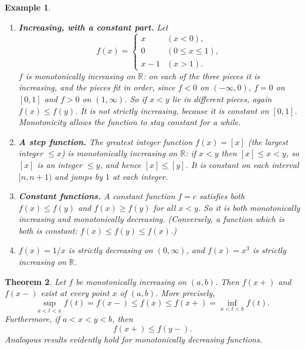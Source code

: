 \documentclass{article}
\theoremstyle{mythm}
\newtheorem{theorem}{Theorem}[section]
\newtheorem{example}[theorem]{Example}
\begin{document}
\begin{example}\label{ex:monotone}
\begin{enumerate}
    \item \textbf{Increasing, with a constant part.} Let
    \[
    f(x) = \begin{cases} x & (x < 0), \\ 0 & (0 \leq x \leq 1), \\ x - 1 & (x > 1). \end{cases}
    \]
    $f$ is monotonically increasing on $\mathbb{R}$: on each of the three pieces it is increasing, and the pieces fit in order, since $f < 0$ on $(-\infty,0)$, $f = 0$ on $[0,1]$ and $f > 0$ on $(1,\infty)$. So if $x < y$ lie in different pieces, again $f(x) \leq f(y)$. It is not strictly increasing, because it is constant on $[0,1]$. Monotonicity allows the function to stay constant for a while.
    \item \textbf{A step function.} The greatest integer function $f(x) = [x]$ (the largest integer $\leq x$) is monotonically increasing on $\mathbb{R}$: if $x < y$ then $[x] \leq x < y$, so $[x]$ is an integer $\leq y$, and hence $[x] \leq [y]$. It is constant on each interval $[n, n+1)$ and jumps by $1$ at each integer.
    \item \textbf{Constant functions.} A constant function $f = c$ satisfies both $f(x) \leq f(y)$ and $f(x) \geq f(y)$ for all $x < y$. So it is \textit{both} monotonically increasing and monotonically decreasing. (Conversely, a function which is both is constant: $f(x) \leq f(y) \leq f(x)$.)
    \item $f(x) = 1/x$ is strictly decreasing on $(0, \infty)$, and $f(x) = x^3$ is strictly increasing on $\mathbb{R}$.
\end{enumerate}
\end{example}

\begin{theorem}\label{thm:monotonelimits}
Let $f$ be monotonically increasing on $(a,b)$. Then $f(x+)$ and $f(x-)$ exist at every point $x$ of $(a,b)$. More precisely,
\[
\sup_{a < t < x} f(t) = f(x-) \leq f(x) \leq f(x+) = \inf_{x < t < b} f(t). \tag{M}
\]
Furthermore, if $a < x < y < b$, then
\[
f(x+) \leq f(y-).
\]
Analogous results evidently hold for monotonically decreasing functions.
\end{theorem}
\end{document}
